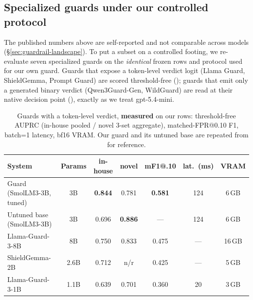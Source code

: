 
\subsection{Specialized guards under our controlled protocol}
\label{sec:guardrail-measured}

The published numbers above are self-reported and not comparable across models (\S\ref{sec:guardrail-landscape}). To put a subset on a controlled footing, we re-evaluate seven specialized guards on the \emph{identical} frozen rows and protocol used for our own guard. Guards that expose a token-level verdict logit (Llama Guard, ShieldGemma, Prompt Guard) are scored threshold-free (); guards that emit only a generated binary verdict (Qwen3Guard-Gen, WildGuard) are read at their native decision point (), exactly as we treat gpt-5.4-mini.

\begin{table}[t]
\small\centering\setlength{\tabcolsep}{4pt}
\caption{Guards with a token-level verdict, \textbf{measured} on our rows: threshold-free AUPRC (in-house pooled / novel 3-set aggregate), matched-FPR@0.10 F1, batch=1 latency, bf16 VRAM. Our guard and its untuned base are repeated from  for reference.}
\label{tab:gr-auprc}
\begin{tabular}{lcccccc}
\toprule
System & Params & in-house & novel & mF1@.10 & lat.\ (ms) & VRAM \\
\midrule
Guard (SmolLM3-3B, tuned) & 3B & \textbf{0.844} & 0.781 & \textbf{0.581} & 124 & 6\,GB \\
Untuned base (SmolLM3-3B) & 3B & 0.696 & \textbf{0.886} & --- & 124 & 6\,GB \\
Llama-Guard-3-8B          & 8B & 0.750 & 0.833 & 0.475 & --- & 16\,GB \\
ShieldGemma-2B            & 2.6B & 0.712 & n/r & 0.425 & --- & 5\,GB \\
Llama-Guard-3-1B          & 1.1B & 0.639 & 0.701 & 0.360 & 20 & 3\,GB \\
\bottomrule
\end{tabular}
\end{table}

